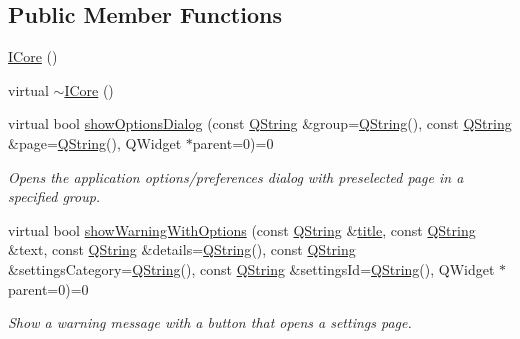 \subsection*{Public Member Functions}
\begin{DoxyCompactItemize}
\item 
\hyperlink{group___core_plugin_gaf7b8469fbd85a1bb1b7f0248054bdf64}{I\-Core} ()
\item 
virtual \hyperlink{group___core_plugin_ga6c02c9e9d4fb7ae94c07d3e4fc6f3696}{$\sim$\-I\-Core} ()
\item 
virtual bool \hyperlink{group___core_plugin_ga36e6d97f61e59bd4ac1d5c1b223d17bc}{show\-Options\-Dialog} (const \hyperlink{group___u_a_v_objects_plugin_gab9d252f49c333c94a72f97ce3105a32d}{Q\-String} \&group=\hyperlink{group___u_a_v_objects_plugin_gab9d252f49c333c94a72f97ce3105a32d}{Q\-String}(), const \hyperlink{group___u_a_v_objects_plugin_gab9d252f49c333c94a72f97ce3105a32d}{Q\-String} \&page=\hyperlink{group___u_a_v_objects_plugin_gab9d252f49c333c94a72f97ce3105a32d}{Q\-String}(), Q\-Widget $\ast$parent=0)=0
\begin{DoxyCompactList}\small\item\em Opens the application options/preferences dialog with preselected {\itshape page} in a specified {\itshape group}. \end{DoxyCompactList}\item 
virtual bool \hyperlink{group___core_plugin_gad71cbf26d3f4d8a8e2fca464d1cc9695}{show\-Warning\-With\-Options} (const \hyperlink{group___u_a_v_objects_plugin_gab9d252f49c333c94a72f97ce3105a32d}{Q\-String} \&\hyperlink{_parse_e_k_f_log_8m_a5df555a5fed35967e041e4abd1269b4e}{title}, const \hyperlink{group___u_a_v_objects_plugin_gab9d252f49c333c94a72f97ce3105a32d}{Q\-String} \&text, const \hyperlink{group___u_a_v_objects_plugin_gab9d252f49c333c94a72f97ce3105a32d}{Q\-String} \&details=\hyperlink{group___u_a_v_objects_plugin_gab9d252f49c333c94a72f97ce3105a32d}{Q\-String}(), const \hyperlink{group___u_a_v_objects_plugin_gab9d252f49c333c94a72f97ce3105a32d}{Q\-String} \&settings\-Category=\hyperlink{group___u_a_v_objects_plugin_gab9d252f49c333c94a72f97ce3105a32d}{Q\-String}(), const \hyperlink{group___u_a_v_objects_plugin_gab9d252f49c333c94a72f97ce3105a32d}{Q\-String} \&settings\-Id=\hyperlink{group___u_a_v_objects_plugin_gab9d252f49c333c94a72f97ce3105a32d}{Q\-String}(), Q\-Widget $\ast$parent=0)=0
\begin{DoxyCompactList}\small\item\em Show a warning message with a button that opens a settings page. \end{DoxyCompactList}\item 

\end{DoxyCompactItemize}
